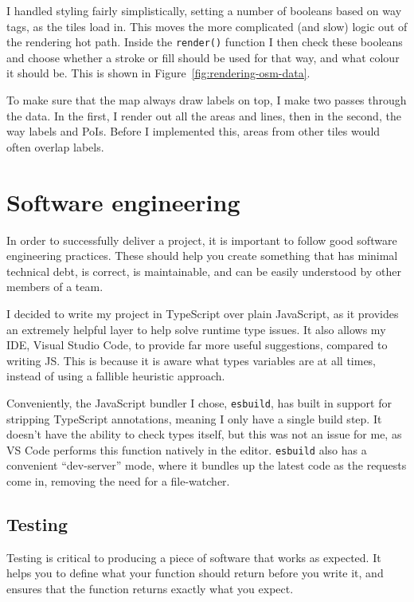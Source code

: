\documentclass{final_report}
\begin{document}
I handled styling fairly simplistically, setting a number of booleans based on way tags, as the tiles load in. This moves the more complicated (and slow) logic out of the rendering hot path. Inside the \texttt{render()} function I then check these booleans and choose whether a stroke or fill should be used for that way, and what colour it should be. This is shown in Figure~\ref{fig:rendering-osm-data}.

To make sure that the map always draw labels on top, I make two passes through the data. In the first, I render out all the areas and lines, then in the second, the way labels and PoIs. Before I implemented this, areas from other tiles would often overlap labels.

\clearpage
\chapter{Software engineering}\label{sec:software-engineering}

In order to successfully deliver a project, it is important to follow good software engineering practices. These should help you create something that has minimal technical debt, is correct, is maintainable, and can be easily understood by other members of a team.

I decided to write my project in TypeScript over plain JavaScript, as it provides an extremely helpful layer to help solve runtime type issues. It also allows my IDE, Visual Studio Code, to provide far more useful suggestions, compared to writing JS\@. This is because it is aware what types variables are at all times, instead of using a fallible heuristic approach.

Conveniently, the JavaScript bundler I chose, \texttt{esbuild}, has built in support for stripping TypeScript annotations, meaning I only have a single build step. It doesn't have the ability to check types itself, but this was not an issue for me, as VS Code performs this function natively in the editor. \texttt{esbuild} also has a convenient ``dev-server'' mode, where it bundles up the latest code as the requests come in, removing the need for a file-watcher.

\section{Testing}

Testing is critical to producing a piece of software that works as expected. It helps you to define what your function should return before you write it, and ensures that the function returns exactly what you expect.
\end{document}
